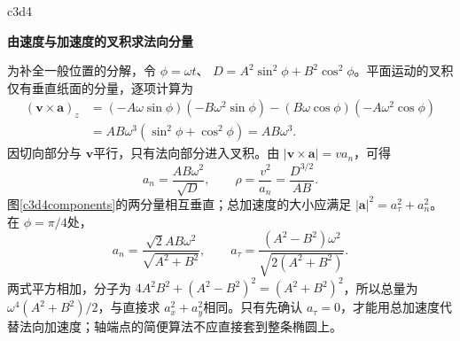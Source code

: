 \begin{drillsolution}{c3d4}
\par\medskip{}\noindent\textbf{由速度与加速度的叉积求法向分量}\par\nobreak
为补全一般位置的分解，令 $\phi=\omega t$、
$D=A^2\sin^2\phi+B^2\cos^2\phi$。平面运动的叉积仅有垂直纸面的分量，逐项计算为
\begin{align*}
(\bm v\times\bm a)_z
 &=(-A\omega\sin\phi)(-B\omega^2\sin\phi)
 -(B\omega\cos\phi)(-A\omega^2\cos\phi)\\
 &=AB\omega^3(\sin^2\phi+\cos^2\phi)=AB\omega^3.
\end{align*}
因切向部分与 $\bm v$平行，只有法向部分进入叉积。由 $|\bm v\times\bm a|=v a_n$，可得
\[a_n=\frac{AB\omega^2}{\sqrt D},\qquad
\rho=\frac{v^2}{a_n}=\frac{D^{3/2}}{AB}.\]
图\ref{c3d4components}的两分量相互垂直；总加速度的大小应满足
$|\bm a|^2=a_\tau^2+a_n^2$。在 $\phi=\pi/4$处，
\[a_n=\frac{\sqrt2AB\omega^2}{\sqrt{A^2+B^2}},\qquad
a_\tau=\frac{(A^2-B^2)\omega^2}{\sqrt{2(A^2+B^2)}}.\]
两式平方相加，分子为
$4A^2B^2+(A^2-B^2)^2=(A^2+B^2)^2$，所以总量为
$\omega^4(A^2+B^2)/2$，与直接求 $a_x^2+a_y^2$相同。只有先确认 $a_\tau=0$，才能用总加速度代替法向加速度；轴端点的简便算法不应直接套到整条椭圆上。
\end{drillsolution}
